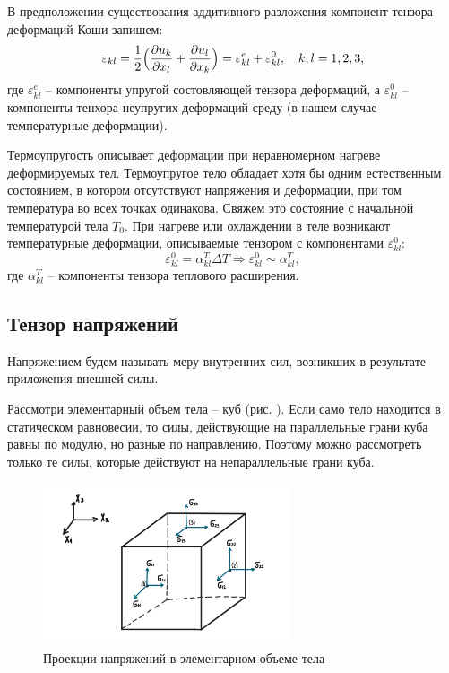 \documentclass[12pt,a4paper]{article}
\begin{document}
    В предположении существования аддитивного разложения компонент тензора деформаций Коши запишем:
    \[
      \varepsilon_{kl} = \dfrac{1}{2}\Bigl( \dfrac{\partial u_k}{\partial x_l} + \dfrac{\partial u_l}{\partial x_k} \Bigr) = \varepsilon_{kl}^e +  \varepsilon_{kl}^0, \quad k, l = 1, 2, 3,
    \]
    \noindent где $\varepsilon_{kl}^e$ -- компоненты упругой состовляющей тензора деформаций, а $ \varepsilon_{kl}^0 $ -- компоненты тенхора неупругих деформаций среду (в нашем случае температурные деформации).
    
    Термоупругость описывает деформации при неравномерном нагреве деформируемых тел. Термоупругое тело обладает хотя бы одним естественным состоянием, в котором отсутствуют напряжения и деформации, при том температура во всех точках одинакова. Свяжем это состояние с начальной температурой тела $T_0$. При нагреве или охлаждении в теле возникают температурные деформации, описываемые тензором с компонентами $ \varepsilon_{kl}^0 \colon$
    \[
      \varepsilon_{kl}^0 = \alpha_{kl}^T \Delta T \Rightarrow \varepsilon_{kl}^0 \sim \alpha_{kl}^T,
    \]
    \noindent где $ \alpha_{kl}^T $ -- компоненты тензора теплового расширения.

    \subsection{Тензор напряжений}

    Напряжением будем называть меру внутренних сил, возникших в результате приложения внешней силы. 

    Рассмотри элементарный объем тела -- куб (рис. ). Если само тело находится в статическом равновесии, то силы, действующие на параллельные грани куба равны по модулю, но разные по направлению. Поэтому можно рассмотреть только те силы, которые действуют на непараллельные грани куба.

    \pagebreak

    \begin{figure}[h]
      \centering
      \includegraphics[width=0.65\textwidth]{cube.jpeg}
      \caption{Проекции напряжений в элементарном объеме тела}
      \label{fig:cube}
    \end{figure}
\end{document}

